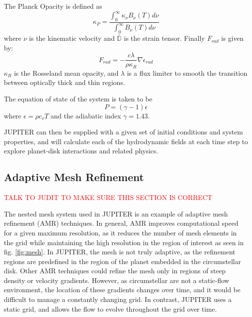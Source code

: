 \documentclass[twocolumn]{aastex62}
\begin{document}
The Planck Opacity is defined as 
\begin{equation}\label{eqn:kp}
\kappa_{P} = \frac{\int_{0}^{\infty}\kappa_{\nu}B_{\nu}\left(T\right)d\nu}{\int_{0}^{\infty}B_{\nu}\left(T\right)d\nu}
\end{equation}
where $\nu$ is the kinematic velocity and $\mathds{\bar{D}}$ is the strain tensor. Finally $F_{rad}$ is given by:
\begin{equation}
F_{rad} = -\frac{c\lambda}{\rho\kappa_{R}}\nabla\epsilon_{rad}
\end{equation}
$\kappa_{R}$ is the Rosseland mean opacity, and $\lambda$ is a flux limiter to smooth the transition between optically thick and thin regions.

The equation of state of the system is taken to be 
\begin{equation}
P = \left(\gamma - 1\right)\epsilon
\end{equation}
where $\epsilon = \rho c_{v}T$ and the adiabatic index $\gamma = 1.43$.

JUPITER can then be supplied with a given set of initial conditions and system properties, and will calculate each of the hydrodynamic fields at each time step to explore planet-disk interactions and related physics.
\subsection{Adaptive Mesh Refinement}\label{sec:amr}
\textcolor{red}{TALK TO JUDIT TO MAKE SURE THIS SECTION IS CORRECT}

The nested mesh system used in JUPITER is an example of adaptive mesh refinement (AMR) techniques. 
In general, AMR improves computational speed for a given maximum resolution, as it reduces the number of mesh elements in the grid while maintaining the high resolution in the region of interest as seen in fig. \ref{fig:mesh}. 
In JUPITER, the mesh is not truly adaptive, as the refinement regions are predefined in the region of the planet embedded in the circumstellar disk.
Other AMR techniques could refine the mesh only in regions of steep density or velocity gradients. 
However, as circumstellar are not a static-flow environment, the location of these gradients changes over time, and it would be difficult to manage a constantly changing grid. 
In contrast, JUPITER uses a static grid, and allows the flow to evolve throughout the grid over time.
\end{document}
